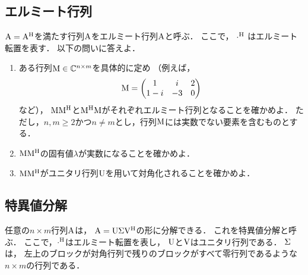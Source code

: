 \subsection{エルミート行列}
  $\mathrm{A} = \mathrm{A}^\mathrm{H}$を満たす行列$\mathrm{A}$をエルミート行列$\mathrm{A}$と呼ぶ．
  ここで， $\cdot^\mathrm{H}$ はエルミート転置を表す．
  以下の問いに答えよ．
  \begin{enumerate}[label=(\roman*)]
    \item ある行列$\mathrm{M} \in \mathbb{C}^{n \times m}$を具体的に定め
      （例えば，
        \begin{equation}
          \mathrm{M} =
            \begin{pmatrix}
              1     & i  & 2 \\
              1 - i & -3 & 0 \\
            \end{pmatrix}
        \end{equation}
        など），
      $\mathrm{M}\mathrm{M}^\mathrm{H}$と$\mathrm{M}^\mathrm{H}\mathrm{M}$がそれぞれエルミート行列となることを確かめよ．
      ただし，$n, m \ge 2$かつ$n \neq m$とし，行列$\mathrm{M}$には実数でない要素を含むものとする．
    \item $\mathrm{M}\mathrm{M}^\mathrm{H}$の固有値$\lambda$が実数になることを確かめよ．
    \item $\mathrm{M}\mathrm{M}^\mathrm{H}$がユニタリ行列$\mathrm{U}$を用いて対角化されることを確かめよ．
  \end{enumerate}

\clearpage
\subsection{特異値分解 \label{linalg:svd}}
  任意の$n \times m$行列$\mathrm{A}$は，
  $\mathrm{A}=\mathrm{U}\mathrm{\Sigma}\mathrm{V}^\mathrm{H}$の形に分解できる．
  これを特異値分解と呼ぶ．
  ここで，$\cdot^\mathrm{H}$はエルミート転置を表し，
  $\mathrm{U}$と$\mathrm{V}$はユニタリ行列である．
  $\mathrm{\Sigma}$は，
  左上のブロックが対角行列で残りのブロックがすべて零行列であるような
  $n \times m$の行列である．

